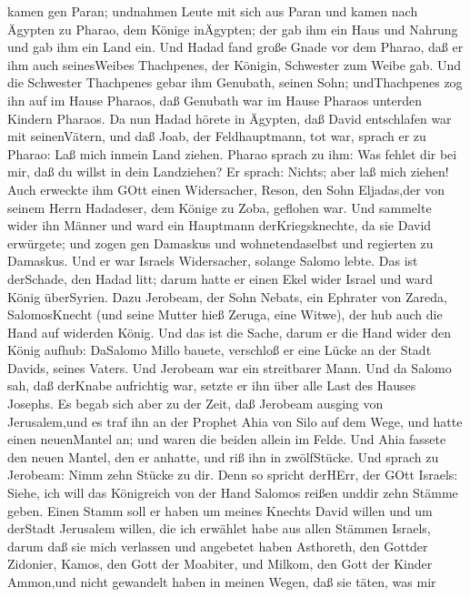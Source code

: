 kamen gen Paran; undnahmen Leute mit sich aus Paran und kamen nach
Ägypten zu Pharao, dem Könige inÄgypten; der gab ihm ein Haus und
Nahrung und gab ihm ein Land ein.  Und Hadad fand große
Gnade vor dem Pharao, daß er ihm auch seinesWeibes Thachpenes, der
Königin, Schwester zum Weibe gab.  Und die Schwester
Thachpenes gebar ihm Genubath, seinen Sohn; undThachpenes zog ihn auf im
Hause Pharaos, daß Genubath war im Hause Pharaos unterden Kindern
Pharaos.  Da nun Hadad hörete in Ägypten, daß David
entschlafen war mit seinenVätern, und daß Joab, der Feldhauptmann, tot
war, sprach er zu Pharao: Laß mich inmein Land ziehen. 
Pharao sprach zu ihm: Was fehlet dir bei mir, daß du willst in dein
Landziehen? Er sprach: Nichts; aber laß mich ziehen!  Auch
erweckte ihm GOtt einen Widersacher, Reson, den Sohn Eljadas,der von
seinem Herrn Hadadeser, dem Könige zu Zoba, geflohen war. 
Und sammelte wider ihn Männer und ward ein Hauptmann derKriegsknechte,
da sie David erwürgete; und zogen gen Damaskus und wohnetendaselbst und
regierten zu Damaskus.  Und er war Israels Widersacher,
solange Salomo lebte. Das ist derSchade, den Hadad litt; darum hatte er
einen Ekel wider Israel und ward König überSyrien.  Dazu
Jerobeam, der Sohn Nebats, ein Ephrater von Zareda, SalomosKnecht (und
seine Mutter hieß Zeruga, eine Witwe), der hub auch die Hand auf
widerden König.  Und das ist die Sache, darum er die Hand
wider den König aufhub: DaSalomo Millo bauete, verschloß er eine Lücke
an der Stadt Davids, seines Vaters.  Und Jerobeam war ein
streitbarer Mann. Und da Salomo sah, daß derKnabe aufrichtig war, setzte
er ihn über alle Last des Hauses Josephs.  Es begab sich
aber zu der Zeit, daß Jerobeam ausging von Jerusalem,und es traf ihn an
der Prophet Ahia von Silo auf dem Wege, und hatte einen neuenMantel an;
und waren die beiden allein im Felde.  Und Ahia fassete den
neuen Mantel, den er anhatte, und riß ihn in zwölfStücke. 
Und sprach zu Jerobeam: Nimm zehn Stücke zu dir. Denn so spricht
derHErr, der GOtt Israels: Siehe, ich will das Königreich von der Hand
Salomos reißen unddir zehn Stämme geben.  Einen Stamm soll
er haben um meines Knechts David willen und um derStadt Jerusalem
willen, die ich erwählet habe aus allen Stämmen Israels, 
darum daß sie mich verlassen und angebetet haben Asthoreth, den Gottder
Zidonier, Kamos, den Gott der Moabiter, und Milkom, den Gott der Kinder
Ammon,und nicht gewandelt haben in meinen Wegen, daß sie täten, was mir
